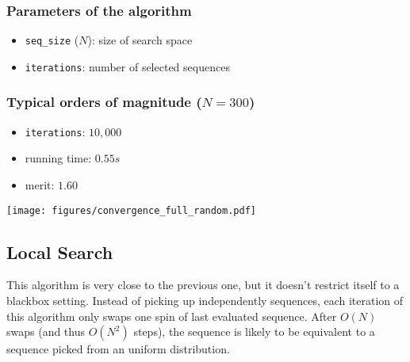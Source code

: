 \documentclass{article}
\begin{document}
  \begin{multicols}{2}

    \subsubsection*{Parameters of the algorithm}
      \begin{itemize}
        \item \texttt{seq\_size} ($N$): size of search space
        \item \texttt{iterations}: number of selected sequences
      \end{itemize}

    \subsubsection*{Typical orders of magnitude ($N = 300$)}

      \begin{itemize}
        \item \texttt{iterations}: $10,000$
        \item running time: $0.55s$
        \item merit: $1.60$
      \end{itemize}

    \vphantom{0}

  \columnbreak

    \texttt{[image: figures/convergence\_full\_random.pdf]}

  \end{multicols}


\subsection{Local Search}

  This algorithm is very close to the previous one, but it doesn't restrict
  itself to a blackbox setting. Instead of picking up independently sequences,
  each iteration of this algorithm only swaps one spin of last evaluated
  sequence. After $O(N)$ swaps (and thus $O(N^2)$ steps), the sequence is
  likely to be equivalent to a sequence picked from an uniform distribution.
\end{document}
